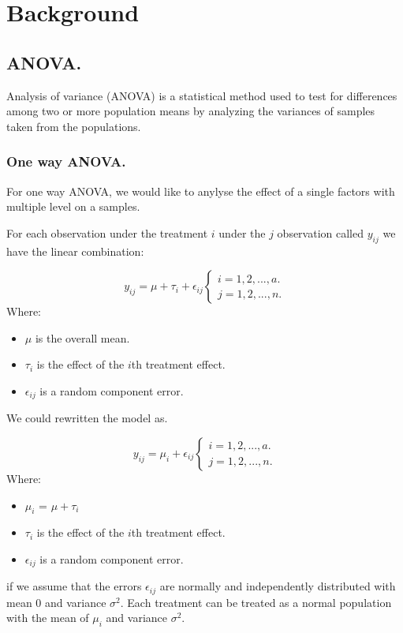 %
%
\clearpage
\section{Background}
\subsection{ANOVA.}
Analysis of variance (ANOVA) is a statistical method used to test for differences among two or more population means by analyzing the variances of samples taken from the populations.
\subsubsection{One way ANOVA.}
For one way ANOVA, we would like to anylyse the effect of a single factors with multiple level on a samples.

For each observation under the treatment $i$ under the $j$ observation called $y_{ij}$ we have the linear combination:

\[y_{ij} = \mu + \tau_i + \epsilon_{ij} 
\begin{cases}
    i = 1,2,...,a.\\
    j = 1,2,...,n.
\end{cases}
\]
Where:
\begin{itemize}
    \item $\mu$ is the overall mean.
    \item $\tau_i$ is the effect of the $i$th treatment effect.
    \item $\epsilon_{ij}$ is a random component error.
\end{itemize}
We could rewritten the model as.

\[y_{ij} = \mu_i + \epsilon_{ij} 
\begin{cases}
    i = 1,2,...,a.\\
    j = 1,2,...,n.
\end{cases}
\]
Where:
\begin{itemize}
    \item $\mu_i$ =  $\mu + \tau_i$
    \item $\tau_i$ is the effect of the $i$th treatment effect.
    \item $\epsilon_{ij}$ is a random component error.
\end{itemize}

if we assume that the errors $\epsilon_{ij}$ are normally and independently distributed with mean 0 and variance $\sigma^2$. Each treatment can be treated as a normal population with the mean of $\mu_i$ and variance $\sigma^2$.

